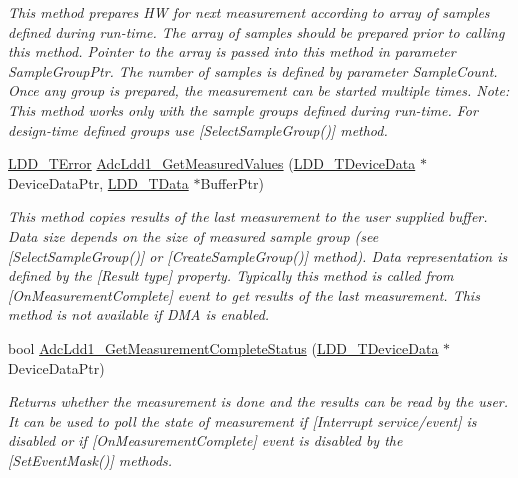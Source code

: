 \begin{DoxyCompactItemize}
\begin{DoxyCompactList}\small\item\em This method prepares HW for next measurement according to array of samples defined during run-\/time. The array of samples should be prepared prior to calling this method. Pointer to the array is passed into this method in parameter Sample\+Group\+Ptr. The number of samples is defined by parameter Sample\+Count. Once any group is prepared, the measurement can be started multiple times. Note\+: This method works only with the sample groups defined during run-\/time. For design-\/time defined groups use \mbox{[}Select\+Sample\+Group()\mbox{]} method. \end{DoxyCompactList}\item 
\hyperlink{group___p_e___types__module_ga24c2b045fd04e79e85f261ce4df35588}{L\+D\+D\+\_\+\+T\+Error} \hyperlink{group___adc_ldd1__module_ga30f524b93639b958a529d6f91c41ce6d}{Adc\+Ldd1\+\_\+\+Get\+Measured\+Values} (\hyperlink{group___p_e___types__module_gac5cf1362f1f0e3a2ce71b1bf2276d091}{L\+D\+D\+\_\+\+T\+Device\+Data} $\ast$Device\+Data\+Ptr, \hyperlink{group___p_e___types__module_gade8ef9401405bd941b6da738b807f980}{L\+D\+D\+\_\+\+T\+Data} $\ast$Buffer\+Ptr)
\begin{DoxyCompactList}\small\item\em This method copies results of the last measurement to the user supplied buffer. Data size depends on the size of measured sample group (see \mbox{[}Select\+Sample\+Group()\mbox{]} or \mbox{[}Create\+Sample\+Group()\mbox{]} method). Data representation is defined by the \mbox{[}Result type\mbox{]} property. Typically this method is called from \mbox{[}On\+Measurement\+Complete\mbox{]} event to get results of the last measurement. This method is not available if D\+MA is enabled. \end{DoxyCompactList}\item 
bool \hyperlink{group___adc_ldd1__module_ga4df44002c6ba3479f104deedd98b7e4e}{Adc\+Ldd1\+\_\+\+Get\+Measurement\+Complete\+Status} (\hyperlink{group___p_e___types__module_gac5cf1362f1f0e3a2ce71b1bf2276d091}{L\+D\+D\+\_\+\+T\+Device\+Data} $\ast$Device\+Data\+Ptr)
\begin{DoxyCompactList}\small\item\em Returns whether the measurement is done and the results can be read by the user. It can be used to poll the state of measurement if \mbox{[}Interrupt service/event\mbox{]} is disabled or if \mbox{[}On\+Measurement\+Complete\mbox{]} event is disabled by the \mbox{[}Set\+Event\+Mask()\mbox{]} methods. \end{DoxyCompactList}\item 

\end{DoxyCompactItemize}
